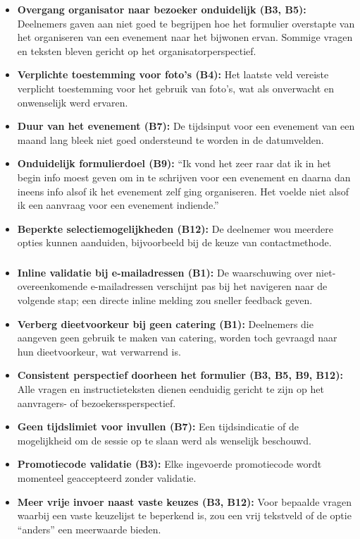 \begin{itemize}
  \item \textbf{Overgang organisator naar bezoeker onduidelijk (B3, B5):} Deelnemers gaven aan niet goed te begrijpen hoe het formulier overstapte van het organiseren van een evenement naar het bijwonen ervan. Sommige vragen en teksten bleven gericht op het organisatorperspectief.
  \item \textbf{Verplichte toestemming voor foto's (B4):} Het laatste veld vereiste verplicht toestemming voor het gebruik van foto's, wat als onverwacht en onwenselijk werd ervaren.
  \item \textbf{Duur van het evenement (B7):} De tijdsinput voor een evenement van een maand lang bleek niet goed ondersteund te worden in de datumvelden.
  \item \textbf{Onduidelijk formulierdoel (B9):} ``Ik vond het zeer raar dat ik in het begin info moest geven om in te schrijven voor een evenement en daarna dan ineens info alsof ik het evenement zelf ging organiseren. Het voelde niet alsof ik een aanvraag voor een evenement indiende.''
  \item \textbf{Beperkte selectiemogelijkheden (B12):} De deelnemer wou meerdere opties kunnen aanduiden, bijvoorbeeld bij de keuze van contactmethode.
\end{itemize}

\subsubsection{}

\begin{itemize}
  \item \textbf{Inline validatie bij e-mailadressen (B1):} De waarschuwing over niet-overeenkomende e-mailadressen verschijnt pas bij het navigeren naar de volgende stap; een directe inline melding zou sneller feedback geven.
  \item \textbf{Verberg dieetvoorkeur bij geen catering (B1):} Deelnemers die aangeven geen gebruik te maken van catering, worden toch gevraagd naar hun dieetvoorkeur, wat verwarrend is.
  \item \textbf{Consistent perspectief doorheen het formulier (B3, B5, B9, B12):} Alle vragen en instructieteksten dienen eenduidig gericht te zijn op het aanvragers- of bezoekerssperspectief.
  \item \textbf{Geen tijdslimiet voor invullen (B7):} Een tijdsindicatie of de mogelijkheid om de sessie op te slaan werd als wenselijk beschouwd.
  \item \textbf{Promotiecode validatie (B3):} Elke ingevoerde promotiecode wordt momenteel geaccepteerd zonder validatie.
  \item \textbf{Meer vrije invoer naast vaste keuzes (B3, B12):} Voor bepaalde vragen waarbij een vaste keuzelijst te beperkend is, zou een vrij tekstveld of de optie ``anders'' een meerwaarde bieden.
\end{itemize}

